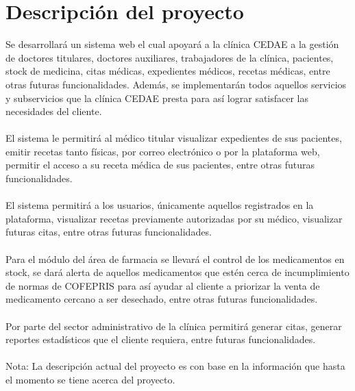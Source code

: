 \documentclass[12pt,letterpaper]{article}
\begin{document}
    \section{Descripción del proyecto}
    \justify
                Se desarrollará un sistema web el cual apoyará a la clínica CEDAE a la gestión de doctores titulares,
                doctores auxiliares, trabajadores de la clínica, pacientes, stock de medicina, citas médicas, expedientes médicos,
                recetas médicas, entre otras futuras funcionalidades.
                Además, se implementarán todos aquellos servicios y subservicios que la clínica CEDAE presta para así lograr satisfacer
                las necesidades del cliente.
                \\\\
                El sistema le permitirá al médico titular visualizar expedientes de sus pacientes, emitir recetas tanto físicas,
                por correo electrónico o por la plataforma web, permitir el acceso a su receta médica de sus pacientes, entre otras futuras funcionalidades.
                \\\\
                El sistema permitirá a los usuarios, únicamente aquellos registrados en la plataforma, visualizar recetas previamente autorizadas por 
                su médico, visualizar futuras citas, entre otras futuras funcionalidades.
                \\\\
                Para el módulo del área de farmacia se llevará el control de los medicamentos en stock, se dará alerta de aquellos medicamentos que estén cerca de incumplimiento 
                de normas de COFEPRIS para así ayudar al cliente a priorizar la venta de medicamento cercano a ser desechado, entre otras futuras funcionalidades.
                \\\\
                Por parte del sector administrativo de la clínica permitirá generar citas, generar reportes estadísticos que el cliente requiera, entre futuras funcionalidades.
                \\\\
                Nota: La descripción actual del proyecto es con base en la información que hasta el momento se tiene acerca del proyecto.
\end{document}
